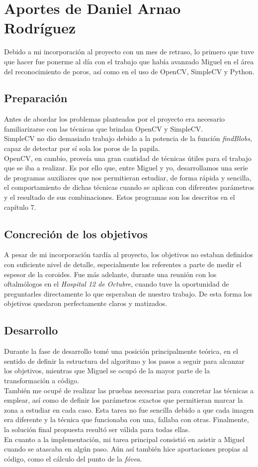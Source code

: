 \section{Aportes de  Daniel Arnao Rodríguez}
Debido a mi incorporación al proyecto con un mes de retraso, lo primero 
que tuve que hacer fue ponerme al día con el trabajo que había avanzado 
Miguel en el área del reconocimiento de poros, así como en el uso de 
OpenCV, SimpleCV y Python.

\subsection{Preparación}
Antes de abordar los problemas planteados por el proyecto era necesario
familiarizarse con las técnicas que brindan OpenCV y SimpleCV. \\
SimpleCV no dio demasiado trabajo debido a la potencia de la función
\emph{findBlobs}, capaz de detectar por sí sola los poros de la papila. \\
OpenCV, en cambio, proveía una gran cantidad de técnicas útiles para el
trabajo que se iba a realizar. Es por ello que, entre Miguel y yo,
desarrollamos una serie de programas auxiliares que nos permitieran
estudiar, de forma rápida y sencilla, el comportamiento de dichas 
técnicas cuando se aplican con diferentes parámetros y el resultado
de sus combinaciones. Estos programas son los descritos en el capítulo 7.

\subsection{Concreción de los objetivos}
A pesar de mi incorporación tardía al proyecto, los objetivos no estaban
definidos con suficiente nivel de detalle, especialmente los referentes
a parte de medir el espesor de la coroides. Fue más adelante, durante 
una reunión con los oftalmólogos en el \emph{Hospital 12 de Octubre},
cuando tuve la oportunidad de preguntarles directamente lo que esperaban
de nuestro trabajo. De esta forma los objetivos quedaron perfectamente
claros y matizados.

\subsection{Desarrollo}
Durante la fase de desarrollo tomé una posición principalmente teórica,
en el sentido de definir la estructura del algoritmo y los pasos a seguir
para alcanzar los objetivos, mientras que Miguel se ocupó de la
mayor parte de la transformación a código. \\
También me ocupé de realizar las pruebas necesarias para concretar las 
técnicas a emplear, así como de definir los parámetros exactos que 
permitieran marcar la zona a estudiar en cada caso. Esta tarea no fue
sencilla debido a que cada imagen era diferente y la técnica que 
funcionaba con una, fallaba con otras. Finalmente, la solución final
propuesta resultó ser válida para todas ellas.\\
En cuanto a la implementación, mi tarea principal consistió
en asistir a Miguel cuando se atascaba en algún paso. Aún así también
hice aportaciones propias al código, como el cálculo del punto de 
la \emph{fóvea}.

